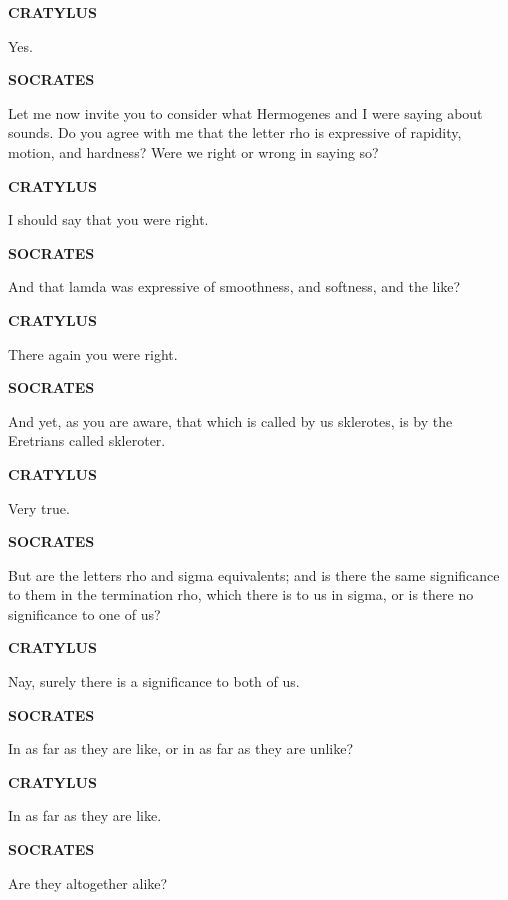 \documentclass[11pt,letter]{article}
\begin{document}
\par \textbf{CRATYLUS}
\par   Yes.

\par \textbf{SOCRATES}
\par   Let me now invite you to consider what Hermogenes and I were saying about sounds. Do you agree with me that the letter rho is expressive of rapidity, motion, and hardness? Were we right or wrong in saying so?

\par \textbf{CRATYLUS}
\par   I should say that you were right.

\par \textbf{SOCRATES}
\par   And that lamda was expressive of smoothness, and softness, and the like?

\par \textbf{CRATYLUS}
\par   There again you were right.

\par \textbf{SOCRATES}
\par   And yet, as you are aware, that which is called by us sklerotes, is by the Eretrians called skleroter.

\par \textbf{CRATYLUS}
\par   Very true.

\par \textbf{SOCRATES}
\par   But are the letters rho and sigma equivalents; and is there the same significance to them in the termination rho, which there is to us in sigma, or is there no significance to one of us?

\par \textbf{CRATYLUS}
\par   Nay, surely there is a significance to both of us.

\par \textbf{SOCRATES}
\par   In as far as they are like, or in as far as they are unlike?

\par \textbf{CRATYLUS}
\par   In as far as they are like.

\par \textbf{SOCRATES}
\par   Are they altogether alike?
\end{document}
